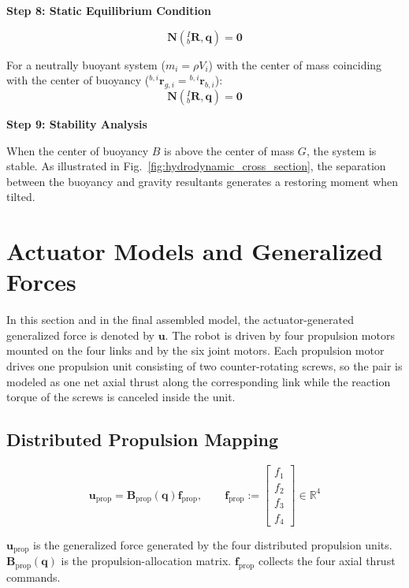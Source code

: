 \documentclass[12pt,a4paper]{report}
\newcommand{\newsymbols}[1]{\par\noindent{}#1\par\vspace{0.35em}}
\begin{document}
\textbf{Step 8: Static Equilibrium Condition}

\begin{equation}
\mathbf{N}({}_{b}^{I}\mathbf{R}, \mathbf{q}) = \mathbf{0}
\end{equation}

For a neutrally buoyant system ($m_i = \rho V_i$) with the center of mass coinciding with the center of buoyancy (${}^{b,i}\mathbf{r}_{g,i} = {}^{b,i}\mathbf{r}_{b,i}$):
\begin{equation}
\mathbf{N}({}_{b}^{I}\mathbf{R}, \mathbf{q}) = \mathbf{0}
\end{equation}

\textbf{Step 9: Stability Analysis}

When the center of buoyancy $B$ is above the center of mass $G$, the system is stable. As illustrated in Fig.~\ref{fig:hydrodynamic_cross_section}, the separation between the buoyancy and gravity resultants generates a restoring moment when tilted.

\chapter{Actuator Models and Generalized Forces}

In this section and in the final assembled model, the actuator-generated generalized force is denoted by $\mathbf{u}$. The robot is driven by four propulsion motors mounted on the four links and by the six joint motors. Each propulsion motor drives one propulsion unit consisting of two counter-rotating screws, so the pair is modeled as one net axial thrust along the corresponding link while the reaction torque of the screws is canceled inside the unit.

\section{Distributed Propulsion Mapping}

\begin{equation}
\mathbf{u}_{\mathrm{prop}} = \mathbf{B}_{\mathrm{prop}}(\mathbf{q}) \mathbf{f}_{\mathrm{prop}},
\qquad
\mathbf{f}_{\mathrm{prop}} :=
\begin{bmatrix}
f_1 \\ f_2 \\ f_3 \\ f_4
\end{bmatrix}
\in \mathbb{R}^{4}
\label{eq:old-145}
\end{equation}
\newsymbols{$\mathbf{u}_{\mathrm{prop}}$ is the generalized force generated by the four distributed propulsion units. $\mathbf{B}_{\mathrm{prop}}(\mathbf{q})$ is the propulsion-allocation matrix. $\mathbf{f}_{\mathrm{prop}}$ collects the four axial thrust commands.}
\end{document}
